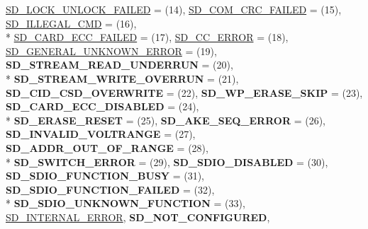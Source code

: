 \begin{DoxyCompactItemize}
\hyperlink{group__sd__card_ggacff91fa68daa1d1ee967b5b3fb3dbd8ca093949ff310e17d6596e686804cd0e1e}{S\+D\+\_\+\+L\+O\+C\+K\+\_\+\+U\+N\+L\+O\+C\+K\+\_\+\+F\+A\+I\+L\+ED} = (14), 
\hyperlink{group__sd__card_ggacff91fa68daa1d1ee967b5b3fb3dbd8ca01a35bd6664353a1af3b9ac093acdf94}{S\+D\+\_\+\+C\+O\+M\+\_\+\+C\+R\+C\+\_\+\+F\+A\+I\+L\+ED} = (15), 
\hyperlink{group__sd__card_ggacff91fa68daa1d1ee967b5b3fb3dbd8ca7fefea39264d07dd179b12be8bf2e51c}{S\+D\+\_\+\+I\+L\+L\+E\+G\+A\+L\+\_\+\+C\+MD} = (16), 
\\*
\hyperlink{group__sd__card_ggacff91fa68daa1d1ee967b5b3fb3dbd8ca283091b73f40d5c229c2c3f3d0f4cb74}{S\+D\+\_\+\+C\+A\+R\+D\+\_\+\+E\+C\+C\+\_\+\+F\+A\+I\+L\+ED} = (17), 
\hyperlink{group__sd__card_ggacff91fa68daa1d1ee967b5b3fb3dbd8ca2c6401e2495de3d9fd3b41c273fda150}{S\+D\+\_\+\+C\+C\+\_\+\+E\+R\+R\+OR} = (18), 
\hyperlink{group__sd__card_ggacff91fa68daa1d1ee967b5b3fb3dbd8ca46c693b1502d9e2137ead7857cfe5f9b}{S\+D\+\_\+\+G\+E\+N\+E\+R\+A\+L\+\_\+\+U\+N\+K\+N\+O\+W\+N\+\_\+\+E\+R\+R\+OR} = (19), 
{\bfseries S\+D\+\_\+\+S\+T\+R\+E\+A\+M\+\_\+\+R\+E\+A\+D\+\_\+\+U\+N\+D\+E\+R\+R\+UN} = (20), 
\\*
{\bfseries S\+D\+\_\+\+S\+T\+R\+E\+A\+M\+\_\+\+W\+R\+I\+T\+E\+\_\+\+O\+V\+E\+R\+R\+UN} = (21), 
{\bfseries S\+D\+\_\+\+C\+I\+D\+\_\+\+C\+S\+D\+\_\+\+O\+V\+E\+R\+W\+R\+I\+TE} = (22), 
{\bfseries S\+D\+\_\+\+W\+P\+\_\+\+E\+R\+A\+S\+E\+\_\+\+S\+K\+IP} = (23), 
{\bfseries S\+D\+\_\+\+C\+A\+R\+D\+\_\+\+E\+C\+C\+\_\+\+D\+I\+S\+A\+B\+L\+ED} = (24), 
\\*
{\bfseries S\+D\+\_\+\+E\+R\+A\+S\+E\+\_\+\+R\+E\+S\+ET} = (25), 
{\bfseries S\+D\+\_\+\+A\+K\+E\+\_\+\+S\+E\+Q\+\_\+\+E\+R\+R\+OR} = (26), 
{\bfseries S\+D\+\_\+\+I\+N\+V\+A\+L\+I\+D\+\_\+\+V\+O\+L\+T\+R\+A\+N\+GE} = (27), 
{\bfseries S\+D\+\_\+\+A\+D\+D\+R\+\_\+\+O\+U\+T\+\_\+\+O\+F\+\_\+\+R\+A\+N\+GE} = (28), 
\\*
{\bfseries S\+D\+\_\+\+S\+W\+I\+T\+C\+H\+\_\+\+E\+R\+R\+OR} = (29), 
{\bfseries S\+D\+\_\+\+S\+D\+I\+O\+\_\+\+D\+I\+S\+A\+B\+L\+ED} = (30), 
{\bfseries S\+D\+\_\+\+S\+D\+I\+O\+\_\+\+F\+U\+N\+C\+T\+I\+O\+N\+\_\+\+B\+U\+SY} = (31), 
{\bfseries S\+D\+\_\+\+S\+D\+I\+O\+\_\+\+F\+U\+N\+C\+T\+I\+O\+N\+\_\+\+F\+A\+I\+L\+ED} = (32), 
\\*
{\bfseries S\+D\+\_\+\+S\+D\+I\+O\+\_\+\+U\+N\+K\+N\+O\+W\+N\+\_\+\+F\+U\+N\+C\+T\+I\+ON} = (33), 
\hyperlink{group__sd__card_ggacff91fa68daa1d1ee967b5b3fb3dbd8ca3edc8995af0f0ca919abd400d01d235d}{S\+D\+\_\+\+I\+N\+T\+E\+R\+N\+A\+L\+\_\+\+E\+R\+R\+OR}, 
{\bfseries S\+D\+\_\+\+N\+O\+T\+\_\+\+C\+O\+N\+F\+I\+G\+U\+R\+ED}, 

\end{DoxyCompactItemize}
